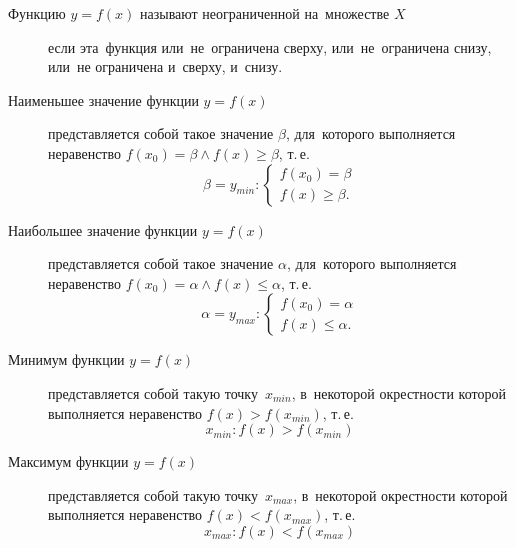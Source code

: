 \documentclass[]{scrartcl}
\begin{document}
\begin{description}
	\item[Функцию ${\textstyle y=f(x)}$ называют неограниченной на~множестве ${\textstyle X}$] если эта~функция или~не~ограничена сверху, или~не~ограничена снизу, или~не ограничена и~сверху, и~снизу.
\end{description}
\begin{description}
	\item[Наименьшее значение функции ${\textstyle y=f(x)}$] представляется собой такое значение ${\textstyle \beta}$, для~которого выполняется неравенство ${\textstyle f(x_0)=\beta \wedge f(x)\geq \beta}$, т.\,е.
	\begin{equation}\label{eq:function-10}
	\beta = y_{min}:
	\begin{cases}
	f(x_0)=\beta\\
	f(x)\geq \beta.
	\end{cases}
	\end{equation}
\end{description}
\begin{description}
	\item[Наибольшее значение функции ${\textstyle y=f(x)}$] представляется собой такое значение ${\textstyle \alpha}$, для~которого выполняется неравенство ${\textstyle f(x_0)=\alpha \wedge f(x)\leq \alpha}$, т.\,е.
	\begin{equation}\label{eq:function-11}
	\alpha = y_{max}:
	\begin{cases}
	f(x_0)=\alpha\\
	f(x)\leq \alpha.
	\end{cases}
	\end{equation}
\end{description}

\begin{description}
	\item[Минимум функции ${\textstyle y=f(x)}$] представляется собой такую точку~${\textstyle x_{min}}$, в~некоторой окрестности которой выполняется неравенство ${\textstyle f(x)>f(x_{min})}$, т.\,е.
	\begin{equation}\label{eq:function-12}
	x_{min}:f(x)>f(x_{min})
	\end{equation}
\end{description}

\begin{description}
	\item[Максимум функции ${\textstyle y=f(x)}$] представляется собой такую точку~${\textstyle x_{max}}$, в~некоторой окрестности которой выполняется неравенство ${\textstyle f(x)<f(x_{max})}$, т.\,е.
	\begin{equation}\label{eq:function-13}
	x_{max}:f(x)<f(x_{max})
	\end{equation}
\end{description}
\end{document}
